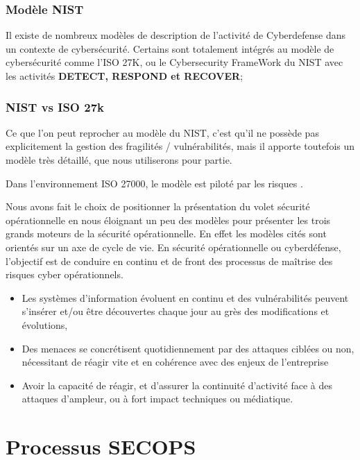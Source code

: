 \begin{frame}
\frametitle<presentation>{Modèle NIST}

Il existe de nombreux modèles de description de l'activité de Cyberdefense dans un contexte de cybersécurité.
Certains sont totalement intégrés au modèle de cybersécurité comme l'ISO 27K, ou le Cybersecurity FrameWork du NIST  avec les activités \textbf{DETECT, RESPOND et RECOVER};
\end{frame}


\begin{frame}
\frametitle<presentation>{NIST vs ISO 27k}
Ce que l'on peut reprocher au modèle du NIST, c'est qu'il ne possède pas explicitement la gestion des fragilités / vulnérabilités, mais il apporte toutefois un modèle très détaillé, que nous utiliserons pour partie.
\end{frame}
Dans l'environnement ISO 27000, le modèle est piloté par les risques .

Nous avons fait le choix de positionner la présentation du volet sécurité opérationnelle en nous éloignant un peu des modèles pour présenter les trois grands moteurs de la sécurité opérationnelle. En effet les modèles cités sont orientés sur un axe de cycle de vie.
En sécurité opérationnelle ou cyberdéfense, l'objectif est de conduire en continu et de front des processus de maîtrise des risques cyber opérationnels.
\begin{itemize}
  \item Les systèmes d'information évoluent en continu et des vulnérabilités peuvent s'insérer et/ou être découvertes chaque jour au grès des modifications et évolutions,
  \item Des menaces se concrétisent quotidiennement par des attaques ciblées ou non, nécessitant de réagir vite et en cohérence avec des enjeux de l'entreprise
  \item Avoir la capacité de réagir, et d'assurer la continuité d'activité face à des attaques d'ampleur, ou à fort impact techniques ou médiatique.
\end{itemize}

\newpage
\section{Processus SECOPS}


